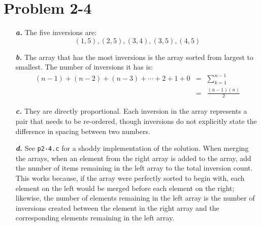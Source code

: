 \documentclass{article}
\begin{document}
\section*{Problem 2-4}

\noindent\begin{enumerate}
	\item[\textbf{\textit{a.}}]
		The five inversions are:
		\begin{equation*}
			(1,5), (2,5), (3,4), (3,5), (4,5)
		\end{equation*}

	\item[\textbf{\textit{b.}}]
		The array that has the most inversions is the array sorted from largest to smallest. The number of inversions it has is:
		\begin{eqnarray*}
			(n-1) + (n-2) + (n-3) + \cdots + 2 + 1 + 0 & = & \sum_{k=1}^{n-1} \\
			& = & \frac{(n-1)(n)}{2}
		\end{eqnarray*}

	\item[\textbf{\textit{c.}}]
		They are directly proportional. Each inversion in the array represents a pair that needs to be re-ordered, though inversions do not explicitly state the difference in spacing between two numbers.

	\item[\textbf{\textit{d.}}] 
		See \texttt{p2-4.c} for a shoddy implementation of the solution. When merging the arrays, when an element from the right array is added to the array, add the number of items remaining in the left array to the total inversion count. This works because, if the array were perfectly sorted to begin with, each element on the left would be merged before each element on the right; likewise, the number of elements remaining in the left array is the number of inversions created between the element in the right array and the corresponding elements remaining in the left array.
\end{enumerate}
\end{document}
